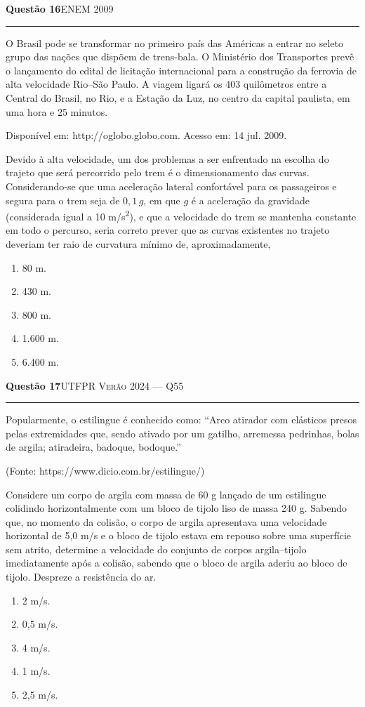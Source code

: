 \documentclass[11pt,a4paper]{article}
\newcommand{\fonte}[1]{{\small\scshape\color{grafite}#1}}
\newenvironment{questao}[2]{%
  \needspace{6\baselineskip}
  \par\addvspace{1.6em}
  {\large\bfseries\color{vinho}Quest\~ao #1}\hfill #2\\[-0.55em]
  {\color{black!25}\rule{\linewidth}{0.4pt}}
  \par\nobreak\smallskip
}{\par\addvspace{0.4em}}
\begin{document}
\begin{questao}{16}{\fonte{ENEM 2009}}
O Brasil pode se transformar no primeiro pa\'is das Am\'ericas a entrar
no seleto grupo das na\c{c}\~oes que disp\~oem de trens-bala. O
Minist\'erio dos Transportes prev\^e o lan\c{c}amento do edital de
licita\c{c}\~ao internacional para a constru\c{c}\~ao da ferrovia de
alta velocidade Rio--S\~ao Paulo. A viagem ligar\'a os 403 quil\^ometros
entre a Central do Brasil, no Rio, e a Esta\c{c}\~ao da Luz, no centro
da capital paulista, em uma hora e 25 minutos.
\begin{flushright}\small
Dispon\'ivel em: http://oglobo.globo.com. Acesso em: 14 jul. 2009.
\end{flushright}

Devido \`a alta velocidade, um dos problemas a ser enfrentado na escolha
do trajeto que ser\'a percorrido pelo trem \'e o dimensionamento das
curvas. Considerando-se que uma acelera\c{c}\~ao lateral confort\'avel
para os passageiros e segura para o trem seja de $0{,}1\,g$, em que $g$
\'e a acelera\c{c}\~ao da gravidade (considerada igual a
10 m/s\textsuperscript{2}), e que a velocidade do trem se mantenha
constante em todo o percurso, seria correto prever que as curvas
existentes no trajeto deveriam ter raio de curvatura m\'inimo de,
aproximadamente,
\begin{enumerate}
  \item 80 m.
  \item 430 m.
  \item 800 m.
  \item 1.600 m.
  \item 6.400 m.
\end{enumerate}
\end{questao}

\begin{questao}{17}{\fonte{UTFPR Ver\~ao 2024 --- Q55}}
Popularmente, o estilingue \'e conhecido como: ``Arco atirador com
el\'asticos presos pelas extremidades que, sendo ativado por um gatilho,
arremessa pedrinhas, bolas de argila; atiradeira, badoque, bodoque.''
\begin{flushright}\small
(Fonte: https://www.dicio.com.br/estilingue/)
\end{flushright}

Considere um corpo de argila com massa de 60 g lan\c{c}ado de um
estilingue colidindo horizontalmente com um bloco de tijolo liso de
massa 240 g. Sabendo que, no momento da colis\~ao, o corpo de argila
apresentava uma velocidade horizontal de 5,0 m/s e o bloco de tijolo
estava em repouso sobre uma superf\'icie sem atrito, determine a
velocidade do conjunto de corpos argila--tijolo imediatamente ap\'os a
colis\~ao, sabendo que o bloco de argila aderiu ao bloco de tijolo.
Despreze a resist\^encia do ar.
\begin{enumerate}
  \item 2 m/s.
  \item 0,5 m/s.
  \item 4 m/s.
  \item 1 m/s.
  \item 2,5 m/s.
\end{enumerate}
\end{questao}
\end{document}
